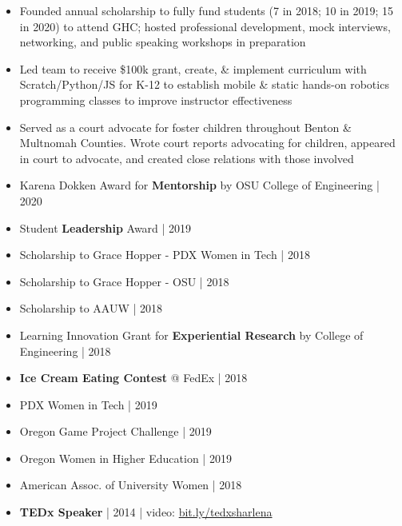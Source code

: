 

\begin{itemize}
    \item{Founded annual scholarship to fully fund students (7 in 2018; 10 in 2019; 15 in 2020) to attend GHC; hosted professional development, mock interviews, networking, and public speaking workshops in preparation}
\end{itemize} \smallskip
{}
\begin{itemize}
    \item {Led team to receive \$100k grant, create, \& implement curriculum with Scratch/Python/JS for K-12 to establish mobile \& static hands-on robotics programming classes to improve instructor effectiveness}
\end{itemize} \smallskip
{}
\begin{itemize}
    \item {Served as a court advocate for foster children throughout Benton \& Multnomah Counties. Wrote court reports advocating for children, appeared in court to advocate, and created close relations with those involved}
\end{itemize}


\begin{itemize}
    \item{Karena Dokken Award for \textbf{Mentorship} by OSU College of Engineering | 2020}
    \item{Student \textbf{Leadership} Award | 2019}
    \item{Scholarship to Grace Hopper - PDX Women in Tech | 2018}
    \item{Scholarship to Grace Hopper - OSU | 2018}
    \item{Scholarship to AAUW | 2018}
    \item{Learning Innovation Grant for \textbf{Experiential Research} by College of Engineering | 2018}
    \item{\textbf{Ice Cream Eating Contest} @ FedEx | 2018}
\end{itemize}

\begin{itemize}
    \item{PDX Women in Tech | 2019}
    \item{Oregon Game Project Challenge | 2019}
    \item{Oregon Women in Higher Education | 2019}
    \item{American Assoc. of University Women | 2018}
    \item{\textbf{TEDx Speaker} | 2014 | video: {\href{https://www.youtube.com/watch?v=wex-7n593cI}{bit.ly/tedxsharlena}}}
\end{itemize}
\smallskip